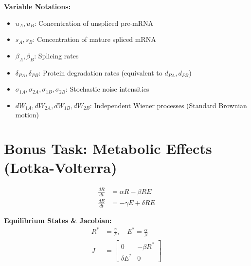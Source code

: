 \documentclass{article}
\begin{document}
\textbf{Variable Notations:}
\begin{itemize}
    \item $u_A, u_B$: Concentration of unspliced pre-mRNA 
    \item $s_A, s_B$: Concentration of mature spliced mRNA
    \item $\beta_A, \beta_B$: Splicing rates
    \item $\delta_{PA}, \delta_{PB}$: Protein degradation rates (equivalent to $d_{PA}, d_{PB}$)
    \item $\sigma_{1A}, \sigma_{2A}, \sigma_{1B}, \sigma_{2B}$: Stochastic noise intensities
    \item $dW_{1A}, dW_{2A}, dW_{1B}, dW_{2B}$: Independent Wiener processes (Standard Brownian motion)
\end{itemize}

\section*{Bonus Task: Metabolic Effects (Lotka-Volterra)}

\begin{align}
    \frac{dR}{dt} &= \alpha R - \beta R E \\
    \frac{dE}{dt} &= -\gamma E + \delta R E
\end{align}

\textbf{Equilibrium States \& Jacobian:}
\begin{align}
    R^* &= \frac{\gamma}{\delta}, \quad E^* = \frac{\alpha}{\beta} \\
    J &= \begin{bmatrix} 0 & -\beta R^* \\ \delta E^* & 0 \end{bmatrix}
\end{align}
\end{document}
